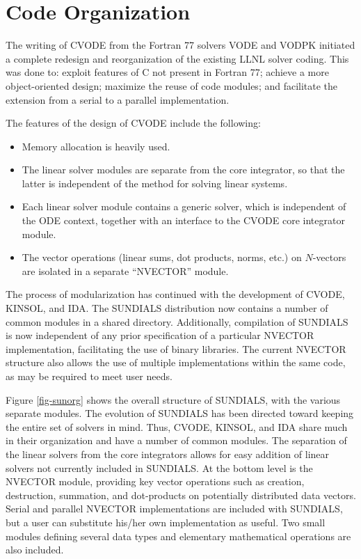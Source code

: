 \section{Code Organization}
\label{s:organization}

The writing of CVODE from the Fortran 77 solvers VODE and VODPK initiated a
complete redesign and reorganization of the existing LLNL solver coding.
This was done to: exploit features of C not present in Fortran 77;
achieve a more object-oriented design; maximize the reuse of code
modules; and facilitate the extension from a serial to a parallel
implementation.

The features of the design of CVODE include the following:
\begin{itemize}
\item Memory allocation is heavily used.
\item The linear solver modules are separate from the core integrator,
so that the latter is independent of the method for solving linear
systems.
\item Each linear solver module contains  a generic solver, which is
independent of the ODE context, together with an interface to the CVODE core
integrator module. 
\item The vector operations  (linear sums, dot products, norms, etc.) on
$N$-vectors are isolated in a separate ``NVECTOR'' module.
\end{itemize}

The process of modularization has continued with the development of CVODE,
KINSOL, and IDA. The SUNDIALS distribution now contains a number of common
modules in a shared directory. Additionally, compilation of SUNDIALS is now
independent of any prior specification of a particular NVECTOR
implementation, facilitating the use of binary libraries. The current
NVECTOR structure also allows the use of multiple implementations within the
same code, as may be required to meet user needs.

Figure \ref{fig-sunorg} shows the overall structure of SUNDIALS, with the
various separate modules. The evolution of SUNDIALS has been directed toward
keeping the entire set of solvers in mind. Thus, CVODE, KINSOL, and IDA share
much in their organization and have a number of common modules.  The
separation of the linear solvers from the core integrators allows for easy
addition of linear solvers not currently included in SUNDIALS. At the bottom
level is the NVECTOR module, providing key vector operations such as
creation, destruction, summation, and dot-products on potentially
distributed data vectors. Serial and parallel NVECTOR implementations are
included with SUNDIALS, but a user can substitute his/her own implementation
as useful. Two small modules defining several data types and elementary
mathematical operations are also included.

